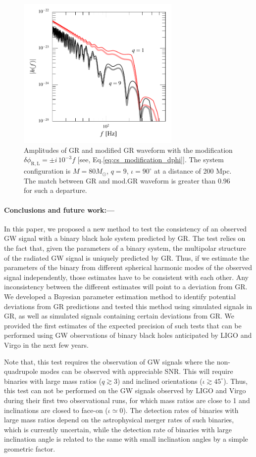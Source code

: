 \documentclass[prl,preprintnumbers,twocolumn,eqsecnum,floatfix,a4paper,nofootinbib,superscriptaddress]{revtex4}
\begin{document}
\begin{figure}[h]
	\includegraphics*[width=3.1in]{figs/mod_GR_waveform.pdf}
	\caption{Amplitudes of GR and modified GR waveform with the modification $\delta \phi_\mathrm{R,L} = \pm i \, 10^{-3} f$ [see, Eq.\eqref{eq:cs_modification_dphi}]. The system configuration is $M = 80 M_{\odot}$, $q = 9$, $\iota=90^{\circ}$ at a distance of 200 Mpc. The match between GR and mod.GR waveform is greater than 0.96 for such a departure.}
\label{fig:mod_gr_waveform}
\end{figure}

\paragraph{Conclusions and future work:---} In this paper, we proposed a new method to test the consistency of an observed GW signal with a binary black hole system predicted by GR. The test relies on the fact that, given the parameters of a binary system, the multipolar structure of the radiated GW signal is uniquely predicted by GR. Thus, if we estimate the parameters of the binary from different spherical harmonic modes of the observed signal independently, those estimates have to be consistent with each other. Any inconsistency between the different estimates will point to a deviation from GR. We developed a Bayesian parameter estimation method to identify potential deviations from GR predictions and tested this method using simulated signals in GR, as well as simulated signals containing certain deviations from GR.  We provided the first estimates of the expected precision of such tests that can be performed using GW observations of binary black holes anticipated by LIGO and Virgo in the next few years. 

Note that, this test requires the observation of GW signals where the non-quadrupole modes can be observed with appreciable SNR. This will require binaries with large mass ratios ($q \gtrsim 3$) and inclined orientations ($\iota \gtrsim 45^{\circ}$). Thus, this test can not be performed on the GW signals observed by LIGO and Virgo during their first two observational runs, for which mass ratios are close to 1 and inclinations are closed to face-on ($\iota \simeq 0$). The detection rates of binaries with large mass ratios depend on the astrophysical merger rates of such binaries, which is currently uncertain, while the detection rate of binaries with large inclination angle is related to the same with small inclination angles by a simple geometric factor. 
\end{document}
